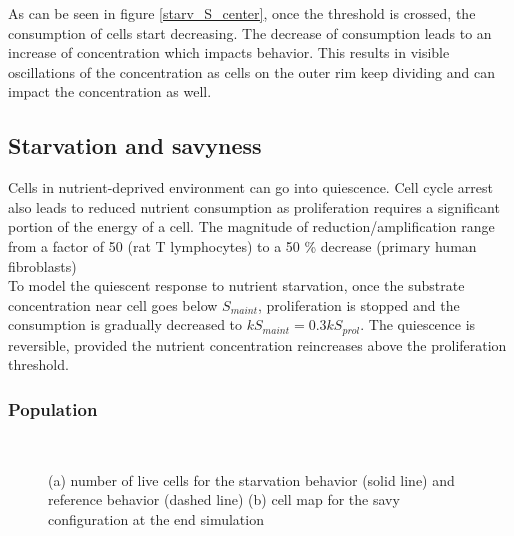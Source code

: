\documentclass[11pt,a4paper]{article}
\begin{document}
As can be seen in figure \ref{starv_S_center}, once the threshold is crossed, the consumption of cells start decreasing. The decrease of consumption leads to an increase of concentration which impacts behavior. This results in visible oscillations of the concentration as cells on the outer rim keep dividing and can impact the concentration as well.\\


\subsection{Starvation and savyness}
Cells in nutrient-deprived environment can go into quiescence. Cell cycle arrest also leads to reduced nutrient consumption as proliferation requires a significant portion of the energy of a cell. The magnitude of reduction/amplification range from a factor of 50 (rat T lymphocytes) to a 50 \% decrease (primary human fibroblasts)\cite{Valcourt2012}\\

To model the quiescent response to nutrient starvation, once the substrate concentration near cell goes below $S_{maint}$, proliferation is stopped and the consumption is gradually decreased to $kS_{maint} = 0.3 kS_{prol}$. The quiescence is reversible, provided the nutrient concentration reincreases above the proliferation threshold. \\


\subsubsection{Population}
\begin{figure}[ht!]
\begin{subfigure}{0.5\textwidth}
	\centering
	
	\caption{ \label{savy_numbers}}
\end{subfigure}
~~
\begin{subfigure}{0.5\textwidth}
	\centering
	
	\caption{\label{savy_Grid}}
\end{subfigure}
\caption{(a) number of live cells for the starvation behavior (solid line) and reference behavior (dashed line) (b) cell map for the savy configuration at the end simulation \label{savy_numbers_Grid}}
\end{figure}
\end{document}

